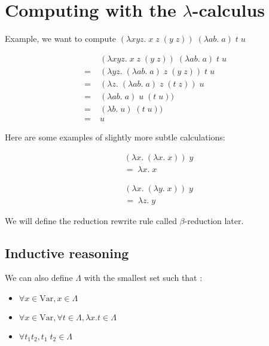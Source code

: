 \section{Computing with the $\lambda$-calculus}

  Example, we want to compute $(\lambda x y z.\; x\; z\; (y\; z))\; (\lambda a
  b.\; a)\; t\; u$

  \begin{align*}
    &\;(\lambda x y z.\; x\; z\; (y\; z))\; (\lambda a b.\; a)\; t\; u \\
    =&\;(\lambda y z.\; (\lambda a b.\; a)\; z\; (y\; z))\; t\; u \\
    =&\;(\lambda z.\; (\lambda a b.\; a)\; z\; (t\; z))\; u \\
    =&\;(\lambda a b.\; a)\; u\; (t\; u))\\
    =&\;(\lambda b.\; u)\; (t\; u))\\
    =&\;u
  \end{align*}

  Here are some examples of slightly more subtle calculations:
  \begin{multicols}{2}
    \begin{align*}
      &(\lambda x.\; (\lambda x.\; x))\; y \\
      &=\; \lambda x.\; x
    \end{align*}

    \begin{align*}
      &(\lambda x.\; (\lambda y.\; x))\; y \\
      &=\; \lambda z.\; y
    \end{align*}
  \end{multicols}

  We will define the reduction rewrite rule called $\beta$-reduction later.

  \subsection{Inductive reasoning}

  We can also define $\Lambda$ with the smallest set such that :

  \begin{itemize}
    \item $\forall x \in \text{Var}, x \in \Lambda$
    \item $\forall x \in \text{Var}, \forall t \in \Lambda, \lambda x.t \in
      \Lambda$
    \item $\forall t_1 t_2, t_1\; t_2 \in \Lambda$
  \end{itemize}

